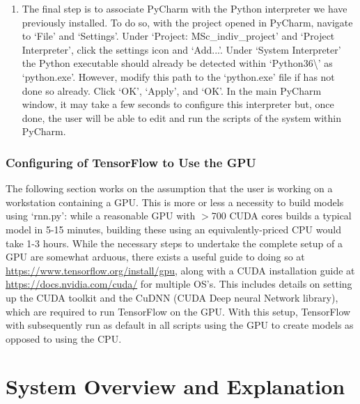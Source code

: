 \documentclass[12pt,twoside]{report}
\begin{document}
\begin{enumerate}
	\item The final step is to associate PyCharm with the Python interpreter we have previously installed. To do so, with the project opened in PyCharm, navigate to ‘File’ and ‘Settings’. Under ‘Project: MSc\_indiv\_project’ and ‘Project Interpreter’, click the settings icon and ‘Add...’. Under ‘System Interpreter’ the Python executable should already be detected within ‘Python36\textbackslash’ as ‘python.exe’. However, modify this path to the ‘python.exe’ file if has not done so already. Click ‘OK’, ‘Apply’, and ‘OK’. In the main PyCharm window, it may take a few seconds to configure this interpreter but, once done, the user will be able to edit and run the scripts of the system within PyCharm.
\end{enumerate}


\section{Configuring of TensorFlow to Use the GPU}

\quad The following section works on the assumption that the user is working on a workstation containing a GPU. This is more or less a necessity to build models using ‘rnn.py’: while a reasonable GPU with $>$700 CUDA cores builds a typical model in 5-15 minutes, building these using an equivalently-priced CPU would take 1-3 hours. While the necessary steps to undertake the complete setup of a GPU are somewhat arduous, there exists a useful guide to doing so at \url{https://www.tensorflow.org/install/gpu}, along with a CUDA installation guide at \url{https://docs.nvidia.com/cuda/} for multiple OS’s. This includes details on setting up the CUDA toolkit and the CuDNN (CUDA Deep neural Network library), which are required to run TensorFlow on the GPU. With this setup, TensorFlow with subsequently run as default in all scripts using the GPU to create models as opposed to using the CPU.











\part{System Overview and Explanation} 
\end{document}

